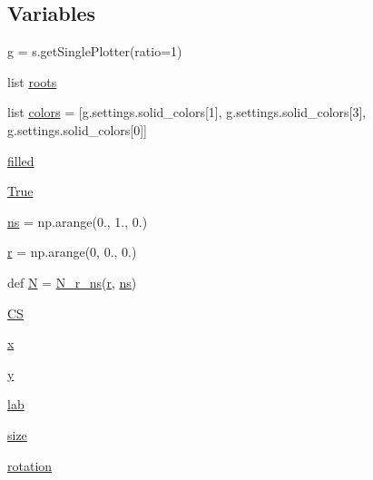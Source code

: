 \subsection*{Variables}
\begin{DoxyCompactItemize}
\item 
\mbox{\hyperlink{namespacens__r__inflation_a84ac48c450a7a40cae54fbb395bcbd3a}{g}} = s.\+get\+Single\+Plotter(ratio=1)
\item 
list \mbox{\hyperlink{namespacens__r__inflation_aa719af8d68630ca7db410961ed42129a}{roots}}
\item 
list \mbox{\hyperlink{namespacens__r__inflation_ac74469ab7814df3a78d0605b500a54df}{colors}} = \mbox{[}g.\+settings.\+solid\+\_\+colors\mbox{[}1\mbox{]}, g.\+settings.\+solid\+\_\+colors\mbox{[}3\mbox{]}, g.\+settings.\+solid\+\_\+colors\mbox{[}0\mbox{]}\mbox{]}
\item 
\mbox{\hyperlink{namespacens__r__inflation_aab0559174abeb9f1fba469fcf5b7ca7e}{filled}}
\item 
\mbox{\hyperlink{namespacens__r__inflation_afa3e6b64342d2f01d5b24a044663ad0b}{True}}
\item 
\mbox{\hyperlink{namespacens__r__inflation_a7678462aaa313287ce9db936063e379e}{ns}} = np.\+arange(0., 1., 0.)
\item 
\mbox{\hyperlink{namespacens__r__inflation_ad1b468856a20486c34d014b6c6743720}{r}} = np.\+arange(0, 0., 0.)
\item 
def \mbox{\hyperlink{namespacens__r__inflation_af8ba77a6c548bd97ef781a5b3e160b84}{N}} = \mbox{\hyperlink{namespacens__r__inflation_aaf7dedd695c74c55a95019501ac075e4}{N\+\_\+r\+\_\+ns}}(\mbox{\hyperlink{namespacens__r__inflation_ad1b468856a20486c34d014b6c6743720}{r}}, \mbox{\hyperlink{namespacens__r__inflation_a7678462aaa313287ce9db936063e379e}{ns}})
\item 
\mbox{\hyperlink{namespacens__r__inflation_ac626acca6862f0bf73236153114929c2}{CS}}
\item 
\mbox{\hyperlink{namespacens__r__inflation_a885639c53206256f4203fa81cb925f8c}{x}}
\item 
\mbox{\hyperlink{namespacens__r__inflation_a50d3e66bbfea2d3ca6a346e366e24b7f}{y}}
\item 
\mbox{\hyperlink{namespacens__r__inflation_a0efe1190d4576c48862f191ba3cd76da}{lab}}
\item 
\mbox{\hyperlink{namespacens__r__inflation_a7c558f69eedea5aecc9705da5d780417}{size}}
\item 
\mbox{\hyperlink{namespacens__r__inflation_a96b44e41456a24a8d5fd574a4a456b06}{rotation}}

\end{DoxyCompactItemize}
